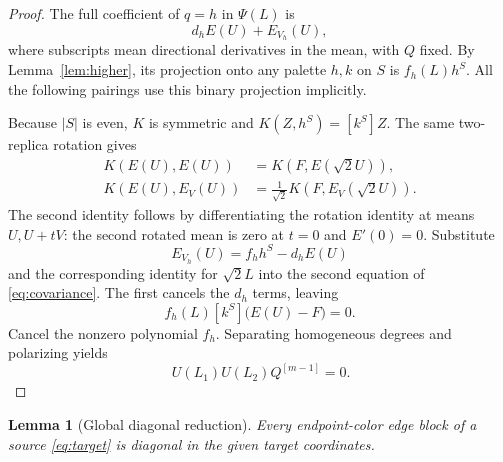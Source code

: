 \documentclass[11pt]{article}
\newtheorem{lemma}[theorem]{Lemma}
\numberwithin{equation}{section}
\begin{document}
\begin{proof}
The full coefficient of \(q=h\) in \(\Psi(L)\) is
\[
 d_h E(U)+E_{V_h}(U),
\]
where subscripts mean directional derivatives in the mean, with \(Q\)
fixed. By Lemma~\ref{lem:higher}, its projection onto any palette \(h,k\)
on \(S\) is \(f_h(L)h^S\). All the following pairings use this binary
projection implicitly.

Because \(|S|\) is even, \(K\) is symmetric and \(K(Z,h^S)=[k^S]Z\).
The same two-replica rotation gives
\begin{equation}
 \begin{aligned}
 K(E(U),E(U))&=K(F,E(\sqrt2U)),\\
 K(E(U),E_V(U))&=\frac{1}{\sqrt2}K(F,E_V(\sqrt2U)).
 \end{aligned}
 \tag{4}\label{eq:covariance}
\end{equation}
The second identity follows by differentiating the rotation identity at
means \(U,U+tV\): the second rotated mean is zero at \(t=0\) and
\(E'(0)=0\). Substitute
\[
 E_{V_h}(U)=f_hh^S-d_hE(U)
\]
and the corresponding identity for \(\sqrt2L\) into the second equation
of \eqref{eq:covariance}. The first cancels the \(d_h\) terms, leaving
\[
 f_h(L)[k^S]\bigl(E(U)-F\bigr)=0.
\]
Cancel the nonzero polynomial \(f_h\). Separating homogeneous degrees and
polarizing yields
\begin{equation}
 [k^S]\,U(L_1)U(L_2)Q^{[m-1]}=0.
 \tag{5}\label{eq:omission}
\end{equation}
\end{proof}

\begin{lemma}[Global diagonal reduction]\label{lem:diagonal}
Every endpoint-color edge block of a source \eqref{eq:target} is diagonal
in the given target coordinates.
\end{lemma}
\end{document}
